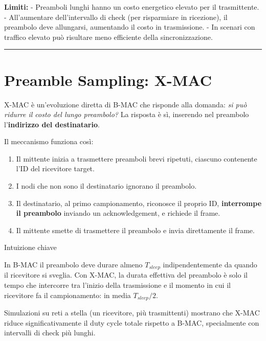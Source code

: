 \documentclass[
  italian,
  openany]{book}
\providecommand{\tightlist}{%
  \setlength{\itemsep}{0pt}\setlength{\parskip}{0pt}}
\begin{document}
\textbf{Limiti:} - Preamboli lunghi hanno un costo energetico elevato
per il trasmittente. - All'aumentare dell'intervallo di check (per
risparmiare in ricezione), il preambolo deve allungarsi, aumentando il
costo in trasmissione. - In scenari con traffico elevato può risultare
meno efficiente della sincronizzazione.

\begin{center}\rule{0.5\linewidth}{0.5pt}\end{center}

\section{Preamble Sampling: X-MAC}\label{preamble-sampling-x-mac}

X-MAC è un'evoluzione diretta di B-MAC che risponde alla domanda:
\emph{si può ridurre il costo del lungo preambolo?} La risposta è sì,
inserendo nel preambolo l'\textbf{indirizzo del destinatario}.

Il meccanismo funziona così:

\begin{enumerate}
\def\labelenumi{\arabic{enumi}.}
\tightlist
\item
  Il mittente inizia a trasmettere preamboli brevi ripetuti, ciascuno
  contenente l'ID del ricevitore target.
\item
  I nodi che non sono il destinatario ignorano il preambolo.
\item
  Il destinatario, al primo campionamento, riconosce il proprio ID,
  \textbf{interrompe il preambolo} inviando un acknowledgement, e
  richiede il frame.
\item
  Il mittente smette di trasmettere il preambolo e invia direttamente il
  frame.
\end{enumerate}

\begin{callouttip}{Intuizione chiave}

In B-MAC il preambolo deve durare almeno \(T_{sleep}\) indipendentemente
da quando il ricevitore si sveglia. Con X-MAC, la durata effettiva del
preambolo è solo il tempo che intercorre tra l'inizio della trasmissione
e il momento in cui il ricevitore fa il campionamento: in media
\(T_{sleep}/2\).

\end{callouttip}

Simulazioni su reti a stella (un ricevitore, più trasmittenti) mostrano
che X-MAC riduce significativamente il duty cycle totale rispetto a
B-MAC, specialmente con intervalli di check più lunghi.
\end{document}
